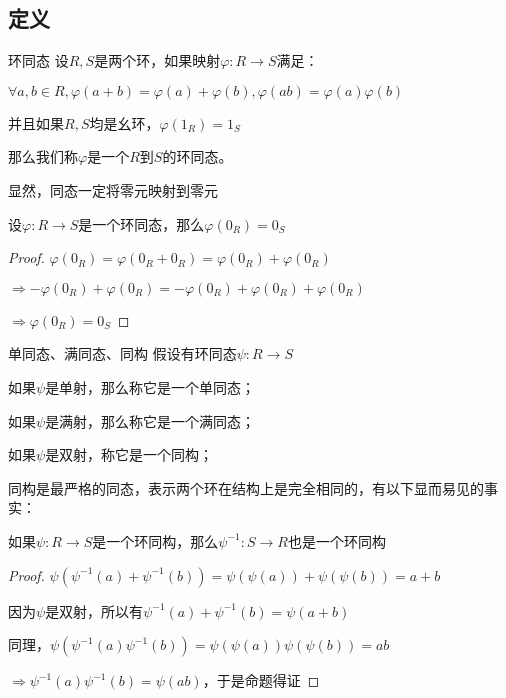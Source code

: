 \documentclass[12pt, a4paper, oneside, UTF8]{ctexbook}
\begin{document}
		\subsection{定义}
			\begin{defn}{环同态}{}
				设$R,S$是两个环，如果映射$\varphi : R \rightarrow S$满足：

				$\forall a,b \in R,\varphi (a+b)=\varphi (a)+\varphi (b),\varphi (ab)=\varphi (a)\varphi (b)$

				并且如果$R,S$均是幺环，$\varphi (1_R)=1_S$
				
				那么我们称$\varphi $是一个$R$到$S$的环同态。
			\end{defn}
			显然，同态一定将零元映射到零元
			\begin{proposition}
				设$\varphi : R \rightarrow S$是一个环同态，那么$\varphi (0_R) = 0_S$
			\end{proposition}
			\begin{proof}
				$\varphi (0_R) = \varphi (0_R + 0_R) = \varphi (0_R) + \varphi (0_R)$

				$\Rightarrow -\varphi (0_R)+\varphi (0_R) = -\varphi (0_R)+\varphi (0_R)+\varphi (0_R)$

				$\Rightarrow \varphi (0_R)=0_S$
			\end{proof}
			\begin{defn}{单同态、满同态、同构}{}
				假设有环同态$\psi :R \rightarrow S$

				如果$\psi $是单射，那么称它是一个单同态；

				如果$\psi $是满射，那么称它是一个满同态；

				如果$\psi $是双射，称它是一个同构；
			\end{defn}
			同构是最严格的同态，表示两个环在结构上是完全相同的，有以下显而易见的事实：
			\begin{proposition}
				如果$\psi : R \rightarrow S$是一个环同构，那么$\psi^{-1} : S \rightarrow R$也是一个环同构
			\end{proposition}
			\begin{proof}
				$\psi \left(\psi^{-1} (a)+\psi^{-1} (b)\right)=\psi \left(\psi (a)\right)+\psi \left(\psi (b)\right)=a+b$

				因为$\psi $是双射，所以有$\psi^{-1} (a)+\psi^{-1} (b)=\psi (a+b)$

				同理，$\psi \left(\psi^{-1} (a)\psi^{-1} (b)\right)=\psi \left(\psi (a)\right)\psi \left(\psi (b)\right)=ab$

				$\Rightarrow \psi^{-1} (a)\psi^{-1} (b)=\psi (ab)$，于是命题得证
			\end{proof}
\end{document}
